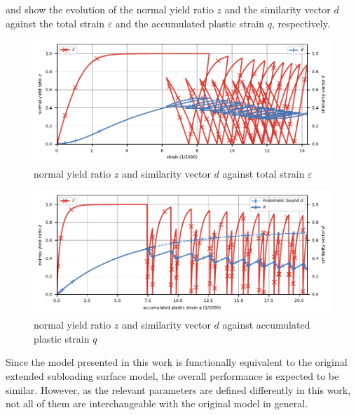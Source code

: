  and  show the evolution of the normal yield ratio $z$ and the similarity vector $d$ against the total strain $\varepsilon$ and the accumulated plastic strain $q$, respectively.
\begin{figure}[htb]
    \centering
    \includegraphics{PIC/CYCLIC/cyclic.ratio.total.pdf}
    \caption{normal yield ratio $z$ and similarity vector $d$ against total strain $\varepsilon$}\label{fig:internal_total}
    \end{figure}
    \begin{figure}[htb]
    \centering
    \includegraphics{PIC/CYCLIC/cyclic.ratio.plastic.pdf}
    \caption{normal yield ratio $z$ and similarity vector $d$ against accumulated plastic strain $q$}\label{fig:internal_q}
\end{figure}
Since the model presented in this work is functionally equivalent to the original extended subloading surface model, the overall performance is expected to be similar.
However, as the relevant parameters are defined differently in this work, not all of them are interchangeable with the original model in general.